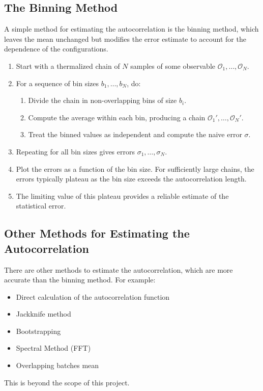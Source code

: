 \subsection{The Binning Method}
A simple method for estimating the autocorrelation is the binning method, which leaves the mean unchanged but modifies the error estimate to account for the dependence of the configurations. 
\begin{enumerate}
    \item Start with a thermalized chain of $N$ samples of some observable ${\mathcal{O}_1, \dots, \mathcal{O}_N}$. 
    \item For a sequence of bin sizes $b_1, \dots, b_N$, do: 
    \begin{enumerate}
        \item Divide the chain in non-overlapping bins of size $b_i$. 
        \item Compute the average within each bin, producing a chain ${\mathcal{O}_1', \dots, \mathcal{O}_N'}$. 
        \item Treat the binned values as independent and compute the naive error $\sigma$. 
    \end{enumerate}
    \item Repeating for all bin sizes gives errors $\sigma_1, \dots, \sigma_N$. 
    \item Plot the errors as a function of the bin size. For sufficiently large chains, the errors typically plateau as the bin size exceeds the autocorrelation length.
    \item The limiting value of this plateau provides a reliable estimate of the statistical error. 
\end{enumerate}
\cite{GattingerLang}
\subsection{Other Methods for Estimating the Autocorrelation}
There are other methods to estimate the autocorrelation, which are more accurate than the binning method. For example: 
\begin{itemize}
    \item Direct calculation of the autocorrelation function
    \item Jackknife method
    \item Bootstrapping
    \item Spectral Method (FFT)
    \item Overlapping batches mean
\end{itemize}
This is beyond the scope of this project. \cite{GattingerLang}